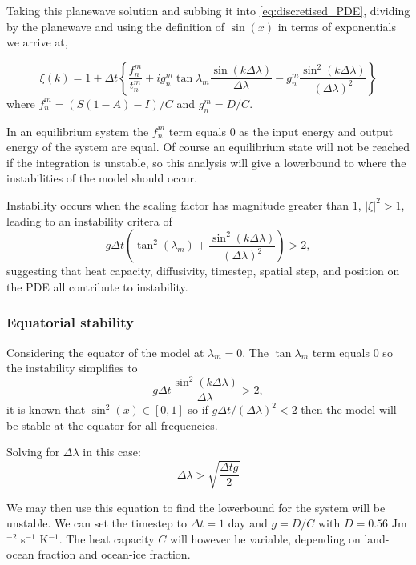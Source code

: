 \documentclass[12pt, onecolumn]{revtex4-2}    %
\begin{document}
Taking this planewave solution and subbing it into \eqref{eq:discretised_PDE}, dividing by the planewave and using the definition of $\sin(x)$ in terms of exponentials we arrive at,

\begin{equation}
    \xi(k) = 1 + \Delta t \left\{\frac{f^m_n}{t^m_n} + i g^m_n \tan\lambda_m \frac{\sin(k\Delta\lambda)}{\Delta\lambda} - g^m_n\frac{\sin^2(k\Delta\lambda)}{(\Delta\lambda)^2}\right\}
\end{equation}
where $f^m_n = (S(1-A) - I) / C$ and $g^m_n = D / C$.

In an equilibrium system the $f^m_n$ term equals $0$ as the input energy and output energy of the system are equal.
Of course an equilibrium state will not be reached if the integration is unstable, so this analysis will give a lowerbound to where the instabilities of the model should occur.

Instability occurs when the scaling factor has magnitude greater than $1$, $| \xi |^2 > 1$, leading to an instability critera of
\begin{equation}
    g \Delta t \left( \tan^2(\lambda_m) + \frac{\sin^2(k\Delta\lambda)}{(\Delta\lambda)^2}\right) > 2,
\end{equation}
suggesting that heat capacity, diffusivity, timestep, spatial step, and position on the PDE all contribute to instability.

\subsubsection*{Equatorial stability}

Considering the equator of the model at $\lambda_m=0$. The $\tan\lambda_m$ term equals $0$ so the instability simplifies to
\begin{equation}
    g \Delta t \frac{\sin^2(k\Delta \lambda)}{\Delta\lambda} > 2,
\end{equation}
it is known that $\sin^2(x) \in [0, 1]$ so if $g \Delta t / (\Delta\lambda)^2 < 2$ then the model will be stable at the equator for all frequencies.

Solving for $\Delta \lambda$ in this case:
\begin{equation}
    \Delta\lambda > \sqrt{\frac{\Delta t g}{2}}
\end{equation}

We may then use this equation to find the lowerbound for the system will be unstable.
We can set the timestep to $\Delta t = 1$ day and $g = D / C$ with $D = 0.56$ Jm$^{-2}$ s$^{-1}$ K$^{-1}$.
The heat capacity $C$ will however be variable, depending on land-ocean fraction and ocean-ice fraction.
\end{document}
